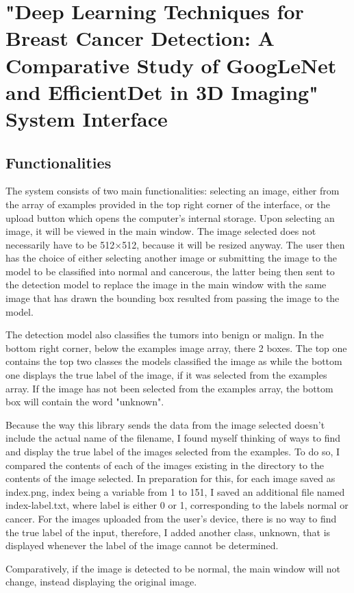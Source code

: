 \chapter{"Deep Learning Techniques for Breast Cancer Detection: A Comparative Study of GoogLeNet and EfficientDet in 3D Imaging" System Interface}
\label{chap:ch5}
\section{Functionalities}
The system consists of two main functionalities: selecting an image, either from the array of examples provided in the top right corner of the interface, or the upload button which opens the computer's internal storage. Upon selecting an image, it will be viewed in the main window. The image selected does not necessarily have to be 512$\times$512, because it will be resized anyway. The user then has the choice of either selecting another image or submitting the image to the model to be classified into normal and cancerous, the latter being then sent to the detection model to replace the image in the main window with the same image that has drawn the bounding box resulted from passing the image to the model. 

The detection model also classifies the tumors into benign or malign. In the bottom right corner, below the examples image array, there 2 boxes. The top one contains the top two classes the models classified the image as while the bottom one displays the true label of the image, if it was selected from the examples array. If the image has not been selected from the examples array, the bottom box will contain the word "unknown".

Because the way this library sends the data from the image selected doesn't include the actual name of the filename, I found myself thinking of ways to find and display the true label of the images selected from the examples. To do so, I compared the contents of each of the images existing in the directory to the contents of the image selected. In preparation for this, for each image saved as index.png, index being a variable from 1 to 151, I saved an additional file named index-label.txt, where label is either 0 or 1, corresponding to the labels normal or cancer. For the images uploaded from the user's device, there is no way to find the true label of the input, therefore, I added another class, unknown, that is displayed whenever the label of the image cannot be determined.

Comparatively, if the image is detected to be normal, the main window will not change, instead displaying the original image.

